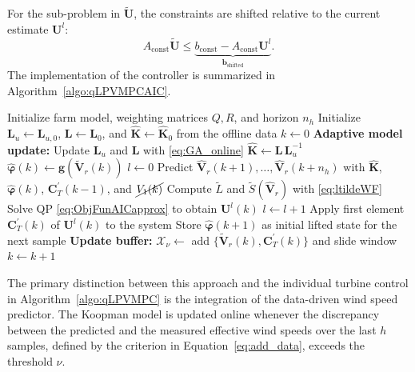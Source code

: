 For the sub-problem in $\tilde{\bm{U}}$, the constraints are shifted relative to the current estimate $\bm{U}^l$:
\[
A_{\text{const}} \tilde{\bm{U}} \le \underbrace{b_{\text{const}} - A_{\text{const}} \bm{U}^l}_{\bm{b}_{\text{shifted}}}.
\]
%
The implementation of the controller is summarized in Algorithm~\ref{algo:qLPVMPCAIC}.
\begin{algorithm}[H]\caption{Adaptive qLMPC for AIC}\label{algo:qLPVMPCAIC}
    \begin{algorithmic}[1]
        \State Initialize farm model, weighting matrices $Q, R$, and horizon $n_h$
        \State Initialize $\mathbf{L}_u \gets \mathbf{L}_{u,0}$, $\mathbf{L} \gets \mathbf{L}_0$, and $\hat{\bm{K}} \gets \hat{\bm{K}}_0$ from the offline data
        \State $k \gets 0$
        \State \textbf{Adaptive model update:}
        \State Update $\mathbf{L}_u$ and $\mathbf{L}$ with \eqref{eq:GA_online}
        \State $\hat{\bm{K}} \gets \mathbf{L}\,\mathbf{L}_u^{-1}$ 
        \State $\hat{\bm{\varphi}}(k) \gets \bm{g}(\tilde{\bm{V}}_r(k))$ 
        \EndIf
        \State $l \gets 0$
         
        \State Predict $\hat{\bm{V}}_r(k+1), \dots, \hat{\bm{V}}_r(k+n_h)$ with $\hat{\bm{K}}$, $\hat{\bm{\varphi}}(k)$, $\bm{C}_T^\prime(k-1)$, and $\cancel{V_1(k)}$
        \State Compute $\tilde{L}$ and $\tilde{S}(\hat{\bm{V}}_r)$ with \eqref{eq:ltildeWF}
        \State Solve QP \eqref{eq:ObjFunAICapprox} to obtain $\bm{U}^l(k)$
        \State $l \gets l + 1$
        \EndWhile
        \State Apply first element $\bm{C}_T^\prime(k)$ of $\bm{U}^l(k)$ to the system
        \State Store $\hat{\bm{\varphi}}(k+1)$ as initial lifted state for the next sample
        \State \textbf{Update buffer:}
        \State $\mathcal{X}_{\nu} \gets$ add $\{\tilde{\bm{V}}_r(k), \bm{C}_T^\prime(k)\}$ and slide window 
        \State $k \gets k + 1$
        \EndWhile
        \EndProcedure
    \end{algorithmic}
\end{algorithm}
%
The primary distinction between this approach and the individual turbine control in Algorithm~\ref{algo:qLPVMPC} is the integration of the data-driven wind speed predictor. The Koopman model is updated online whenever the discrepancy between the predicted and the measured effective wind speeds over the last $h$ samples, defined by the criterion in Equation~\eqref{eq:add_data}, exceeds the threshold $\nu$.
